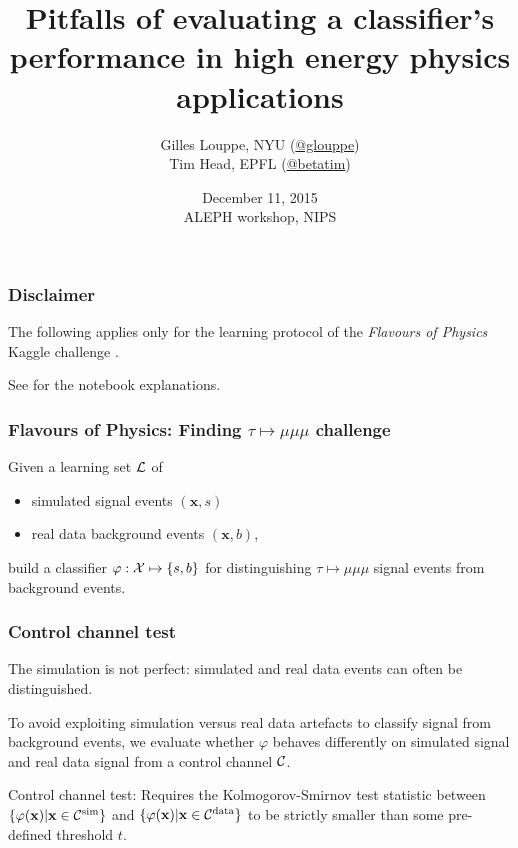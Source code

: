 \documentclass{beamer}
\title{{\bf Pitfalls of evaluating a classifier's performance in high energy physics applications}}
\author{
Gilles Louppe, NYU (\href{https://twitter.com/glouppe}{@glouppe}) \\
Tim Head, EPFL (\href{https://twitter.com/betatim}{@betatim}) \\
}
\date{December 11, 2015\\
ALEPH workshop, NIPS}
\begin{document}
\begin{frame}[plain]
\titlepage
\end{frame}


\begin{frame}
\frametitle{Disclaimer}

The following applies {\color{red} only} for the learning protocol of the {\it
Flavours of Physics} Kaggle challenge \citep{blake2014}.

\vspace{1cm}

See \citep{louppe2014} for the notebook explanations.

\end{frame}


\begin{frame}
\frametitle{Flavours of Physics: Finding $\tau \mapsto \mu\mu\mu$ challenge}

Given a learning set ${\cal L}$ of

\vspace{0.5cm}

\begin{itemize}
\item simulated signal events $(\mathbf{x}, s)$
\item real data background events $(\mathbf{x}, b)$,
\end{itemize}

\vspace{0.5cm}

build a classifier $\varphi : {\cal X} \mapsto \{s, b\}$ for distinguishing
$\tau \mapsto \mu\mu\mu$ signal events from background events.

\end{frame}


\begin{frame}
\frametitle{Control channel test}

The simulation is not perfect: {\color{red} simulated and real data events can
often be distinguished}.

\vspace{1cm}

To avoid exploiting simulation versus real data artefacts to classify signal
from background events, we {\color{blue}evaluate whether $\varphi$ behaves
differently on simulated signal and real data signal from a control channel
${\cal C}$}.

\vspace{1cm}

Control channel test: Requires the Kolmogorov-Smirnov test statistic between $\{
\varphi(\mathbf{x}) | \mathbf{x} \in {\cal C}^\text{sim} \}$ and $\{
\varphi(\mathbf{x}) | \mathbf{x} \in {\cal C}^\text{data} \}$ to be strictly
smaller than some pre-defined threshold $t$.

\end{frame}
\end{document}
